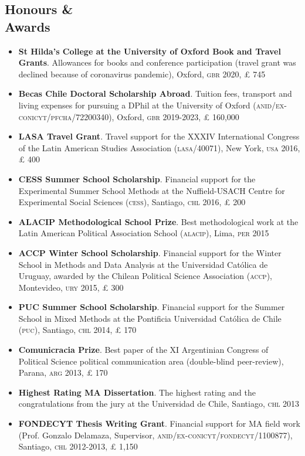\documentclass[letterpaper,margin]{res}
\begin{document}
\begin{resume}
\section{\footnotesize Honours \& \\ Awards} 

\begin{itemize}
\item{\small {\bfseries St Hilda's College at the University of Oxford Book and Travel Grants}. Allowances for books and conference participation (travel grant was declined because of coronavirus pandemic), Oxford, {\scshape gbr} 2020, {\pounds} 745}
\item{\small {\bfseries Becas Chile Doctoral Scholarship Abroad}. Tuition fees, transport and living expenses for pursuing a DPhil at the University of Oxford ({\scshape anid/ex-conicyt/pfcha}/72200340), Oxford, {\scshape gbr} 2019-2023, {\pounds} 160,000}
\item{\small {\bfseries LASA Travel Grant}. Travel support for the XXXIV International Congress of the Latin American Studies Association ({\scshape lasa}/40071), New York, {\scshape usa} 2016, {\pounds} 400}
\end{itemize}\pagebreak
\begin{itemize}
\item{\small {\bfseries CESS Summer School Scholarship}. Financial support for the Experimental Summer School Methods at the Nuffield-USACH Centre for Experimental Social Sciences ({\scshape cess}), Santiago, {\scshape chl} 2016, {\pounds} 200}
\item {\small {\bfseries ALACIP Methodological School Prize}. Best methodological work at the Latin American Political Association School ({\scshape alacip}), Lima, {\scshape per} 2015}
\item{\small {\bfseries ACCP Winter School Scholarship}. Financial support for the Winter School in Methods and Data Analysis at the Universidad Cat\'olica de Uruguay, awarded by the Chilean Political Science Association ({\scshape accp}), Montevideo, {\scshape ury} 2015, {\pounds} 300}
\item{\small {\bfseries PUC Summer School Scholarship}. Financial support for the Summer School in Mixed Methods at the Pontificia Universidad Cat\'olica de Chile ({\scshape puc}), Santiago, {\scshape chl} 2014, {\pounds} 170}
\item{\small {\bfseries Comunicracia Prize}. Best paper of the XI Argentinian Congress of Political Science political communication area (double-blind peer-review), Parana, {\scshape arg} 2013, {\pounds} 170}
\item{\small {\bfseries Highest Rating MA Dissertation}. The highest rating and the congratulations from the jury at the Universidad de Chile, Santiago, {\scshape chl} 2013}
\item{\small {\bfseries FONDECYT Thesis Writing Grant}. Financial support for MA field work (Prof. Gonzalo Delamaza, Supervisor, {\scshape anid/ex-conicyt/fondecyt}/1100877), Santiago, {\scshape chl} 2012-2013, {\pounds} 1,150} %
\end{itemize}


\end{resume}
\end{document}
